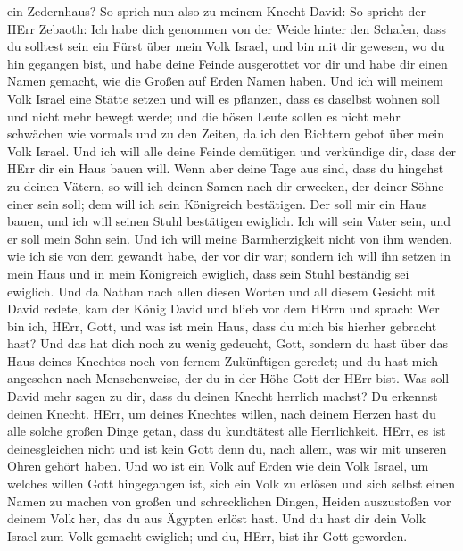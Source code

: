 ein Zedernhaus?  So sprich nun also zu meinem Knecht David:
So spricht der HErr Zebaoth: Ich habe dich genommen von der Weide hinter
den Schafen, dass du solltest sein ein Fürst über mein Volk Israel,
 und bin mit dir gewesen, wo du hin gegangen bist, und habe
deine Feinde ausgerottet vor dir und habe dir einen Namen gemacht, wie
die Großen auf Erden Namen haben.  Und ich will meinem Volk
Israel eine Stätte setzen und will es pflanzen, dass es daselbst wohnen
soll und nicht mehr bewegt werde; und die bösen Leute sollen es nicht
mehr schwächen wie vormals und zu den Zeiten, da ich den Richtern gebot
über mein Volk Israel.  Und ich will alle deine Feinde
demütigen und verkündige dir, dass der HErr dir ein Haus bauen will.
 Wenn aber deine Tage aus sind, dass du hingehst zu deinen
Vätern, so will ich deinen Samen nach dir erwecken, der deiner Söhne
einer sein soll; dem will ich sein Königreich bestätigen. 
Der soll mir ein Haus bauen, und ich will seinen Stuhl bestätigen
ewiglich.  Ich will sein Vater sein, und er soll mein Sohn
sein. Und ich will meine Barmherzigkeit nicht von ihm wenden, wie ich
sie von dem gewandt habe, der vor dir war;  sondern ich
will ihn setzen in mein Haus und in mein Königreich ewiglich, dass sein
Stuhl beständig sei ewiglich.  Und da Nathan nach allen
diesen Worten und all diesem Gesicht mit David redete,  kam
der König David und blieb vor dem HErrn und sprach: Wer bin ich, HErr,
Gott, und was ist mein Haus, dass du mich bis hierher gebracht hast?
 Und das hat dich noch zu wenig gedeucht, Gott, sondern du
hast über das Haus deines Knechtes noch von fernem Zukünftigen geredet;
und du hast mich angesehen nach Menschenweise, der du in der Höhe Gott
der HErr bist.  Was soll David mehr sagen zu dir, dass du
deinen Knecht herrlich machst? Du erkennst deinen Knecht. 
HErr, um deines Knechtes willen, nach deinem Herzen hast du alle solche
großen Dinge getan, dass du kundtätest alle Herrlichkeit. 
HErr, es ist deinesgleichen nicht und ist kein Gott denn du, nach allem,
was wir mit unseren Ohren gehört haben.  Und wo ist ein
Volk auf Erden wie dein Volk Israel, um welches willen Gott hingegangen
ist, sich ein Volk zu erlösen und sich selbst einen Namen zu machen von
großen und schrecklichen Dingen, Heiden auszustoßen vor deinem Volk her,
das du aus Ägypten erlöst hast.  Und du hast dir dein Volk
Israel zum Volk gemacht ewiglich; und du, HErr, bist ihr Gott geworden.
